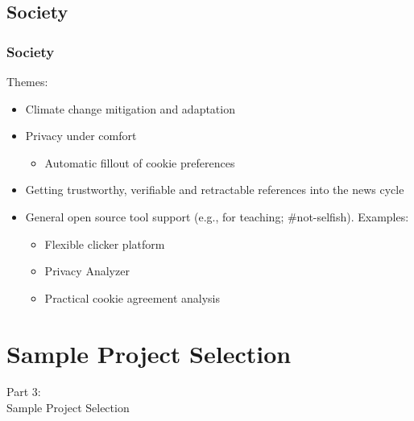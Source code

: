\subsection{Society}
\begin{frame}
    \frametitle{Society}
    \vspace{3mm}
    Themes:
    \begin{itemize}
        \item Climate change mitigation and adaptation
        \item Privacy under comfort
          \begin{itemize}
            \item Automatic fillout of cookie preferences
          \end{itemize}
        \item Getting trustworthy, verifiable and retractable references into the news cycle
        \item General open source tool support (e.g., for teaching; \#not-selfish). Examples:
          \begin{itemize}
            \item Flexible clicker platform
              \\
            \item Privacy Analyzer
              \\
            \item Practical cookie agreement analysis
              \\
          \end{itemize}
    \end{itemize}
\end{frame}

\section{Sample Project Selection}
\begin{frame}
    \vspace{25mm}
    \begin{center}
        \Huge{Part 3:\\Sample Project Selection}
    \end{center}
\end{frame}

